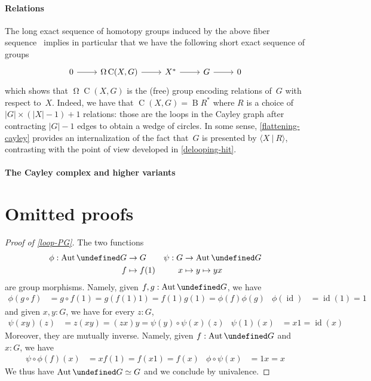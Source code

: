 \documentclass[10pt,a4paper]{amsart}
\theoremstyle{definition}
\newcommand{\freegroup}[1]{#1^*} %
\newcommand{\id}{\operatorname{id}} %
\newcommand{\pres}[2]{\langle #1\ |\ #2\rangle} %
\newcommand{\sizeof}[1]{|#1|} %
\newcommand{\B}{\operatorname{B}} %
\newcommand{\defd}{:=} %
\newcommand{\Cayley}[2]{\operatorname{C}(#1,#2)}
\newcommand{\Aut}{\operatorname{Aut}} %
\newcommand{\Loop}{\operatorname{\Omega}} %
\let\P\undefined
\newcommand{\P}[1]{\operatorname{P}_{#1}} %
\newcommand{\ie}{i.e.~}
\begin{document}
\paragraph{Relations}
The long exact sequence of homotopy groups induced by the above fiber
sequence~\cite[Theorem 8.4.6]{hottbook} implies in particular that we have the
following short exact sequence of groups
\[
  \begin{tikzcd}
  \label{exseq-cayley}
    0\ar[r] &\Loop\Cayley XG\ar[r] &\freegroup X \ar[r]&G\ar[r] & 0
  \end{tikzcd}
\]
which shows that $\Loop\Cayley XG$ is the (free) group encoding relations of~$G$
with respect to~$X$. Indeed, we have that $\Cayley XG=\B\freegroup R$ where $R$
is a choice of $\sizeof G\times(\sizeof X-1)+1$ relations: those are the loops
in the Cayley graph after contracting $\sizeof G-1$ edges to obtain a wedge of
circles. In some sense, \cref{flattening-cayley} provides an internalization of
the fact that~$G$ is presented by $\pres XR$, contrasting with the point of view
developed in \cref{delooping-hit}.

\paragraph{The Cayley complex and higher variants}

\appendix
\section{Omitted proofs}
\label{omitted-proofs}
\begin{proof}[Proof of \cref{loop-PG}]
  The two functions
  \begin{align*}
    \phi:\Aut\P G&\to G
    &
    \psi:G&\to\Aut\P G
    \\
    f&\mapsto f(1)
    &
    x&\mapsto y\mapsto yx
  \end{align*}
  are group morphisms. Namely, given $f,g:\Aut\P G$, we have
  \begin{align*}
    \phi(g\circ f)&=g\circ f(1)=g(f(1)1)=f(1)g(1)=\phi(f)\phi(g)
    &
    \phi(\id)&=\id(1)=1
  \end{align*}
  and given $x,y:G$, we have for every $z:G$,
  \begin{align*}
    \psi(xy)(z)&=z(xy)=(zx)y=\psi(y)\circ\psi(x)(z)
    &
    \psi(1)(x)&=x1=\id(x)
  \end{align*}
  Moreover, they are mutually inverse. Namely, given $f:\Aut\P G$ and $x:G$, we
  have
  \begin{align*}
    \psi\circ\phi(f)(x)&=xf(1)=f(x1)=f(x)
    &
    \phi\circ\psi(x)&=1x=x    
  \end{align*}
  We thus have $\Aut\P G\simeq G$ and we conclude by univalence.
\end{proof}
\end{document}
